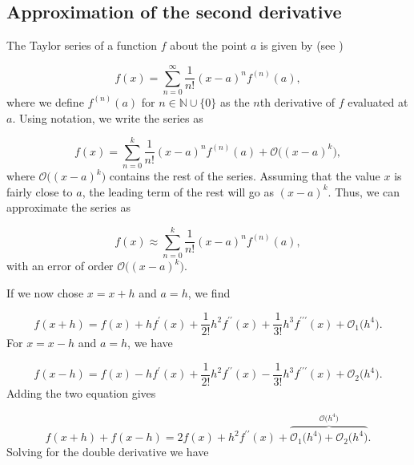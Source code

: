 \documentclass{emulateapj}
\begin{document}
\subsection{Approximation of the second derivative}
The Taylor series of a function \(f\) about the point \(a\) is given by (see \cite[Chapter 11]{matmet})

\begin{equation*}
    f(x) = \sum_{n=0}^{\infty}\frac{1}{n!}\left(x-a\right)^{n}f^{(n)}(a),
\end{equation*}
where we define \(f^{(n)}(a)\) for \(n\in\mathbb{N}\cup\{0\}\) as the \(n\)th derivative of \(f\) evaluated at \(a\). Using  notation, we write the series as

\begin{equation*}
    f(x) = \sum_{n=0}^{k}\frac{1}{n!}\left(x-a\right)^{n}f^{(n)}(a) + \mathcal{O}\big((x-a)^{k}\big),
\end{equation*}
where \(\mathcal{O}\big((x-a)^{k}\big)\) contains the rest of the series. Assuming that the value \(x\) is fairly close to \(a\), the leading term of the rest will go as \((x-a)^{k}\). Thus, we can approximate the series as 

\begin{equation*}
    f(x) \approx \sum_{n=0}^{k}\frac{1}{n!}\left(x-a\right)^{n}f^{(n)}(a),
\end{equation*}
with an error of order \(\mathcal{O}\big((x-a)^{k}\big)\).

If we now chose \(x = x + h\) and \(a = h\), we find

\begin{equation*}
    f(x+h) = f(x) + hf^{\prime}(x) + \frac{1}{2!}h^{2}f^{\prime\prime}(x) + \frac{1}{3!}h^{3}f^{\prime\prime\prime}(x) + \mathcal{O}_{1}\big(h^{4}\big).
\end{equation*}
For \(x = x - h\) and \(a = h\), we have

\begin{equation*}
    f(x-h) = f(x) - hf^{\prime}(x) + \frac{1}{2!}h^{2}f^{\prime\prime}(x) - \frac{1}{3!}h^{3}f^{\prime\prime\prime}(x) + \mathcal{O}_{2}\big(h^{4}\big).
\end{equation*}
Adding the two equation gives

\begin{equation*}
    f(x+h) + f(x-h) = 2f(x) + h^{2}f^{\prime\prime}(x) + \overbrace{\mathcal{O}_{1}\big(h^{4}\big) + \mathcal{O}_{2}\big(h^{4}\big)}^{\mathcal{O}\big(h^{4}\big)}.
\end{equation*}
Solving for the double derivative we have
\end{document}
